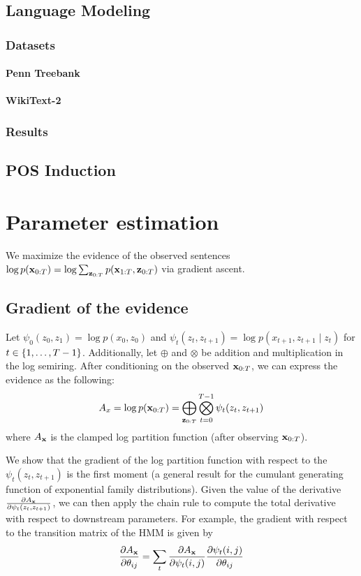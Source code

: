 \documentclass[12pt]{article}
\begin{document}
\subsection{Language Modeling}
\subsubsection{Datasets}
\paragraph{Penn Treebank}
\paragraph{WikiText-2}

\subsubsection{Results}


\subsection{POS Induction}

\appendix
\section{Parameter estimation}
We maximize the evidence of the observed sentences
$\log p(\mathbf{x}_{0:T}) = \log \sum_{\mathbf{z}_{0:T}} p(\mathbf{x}_{1:T}, \mathbf{z}_{0:T})$
via gradient ascent.

\subsection{Gradient of the evidence}
Let $\psi_0(z_0, z_1) = \log p(x_0, z_0)$ and
$\psi_t(z_{t}, z_{t+1}) = \log p(x_{t+1}, z_{t+1} \mid z_{t})$ for $t \in \left\{1, \ldots, T-1\right\}$.
Additionally, let $\oplus$ and $\otimes$ be addition and multiplication in the log semiring.
After conditioning on the observed $\mathbf{x}_{0:T}$, we can express the evidence as the following:
\begin{equation}
\label{eqn:evidence}
A_x = \log p(\mathbf{x}_{0:T}) = \bigoplus_{\mathbf{z}_{0:T}}\bigotimes_{t=0}^{T-1} \psi_t(z_t, z_{t+1})
\end{equation}
where $A_{\mathbf{x}}$ is the clamped log partition function (after observing $\mathbf{x}_{0:T}$).

We show that the gradient of the log partition function with respect to the $\psi_t(z_t, z_{t+1})$
is the first moment (a general result for the cumulant generating function
of exponential family distributions). Given the value of the derivative
$\frac{\partial A_{\mathbf{x}}}{\partial \psi_t(z_t, z_{t+1})}$,
we can then apply the chain rule to compute the total derivative with respect to
downstream parameters. For example, the gradient with respect to the transition matrix
of the HMM is given by
$$\frac{\partial A_{\mathbf{x}}}{\partial \theta_{ij}}
= \sum_t \frac{\partial A_{\mathbf{x}}}{\partial \psi_t(i,j)}
\frac{\partial \psi_t(i,j)}{\partial \theta_{ij}}$$
\end{document}
